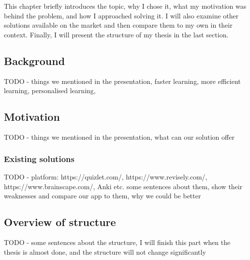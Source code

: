 \chapter{\bevezetes}

This chapter briefly introduces the topic, why I chose it, what my motivation was behind the problem, and how I approached solving it. I will also examine other solutions available on the market and then compare them to my own in their context. Finally, I will present the structure of my thesis in the last section.

\section{Background}
TODO - things we mentioned in the presentation, faster learning, more efficient learning, personalised learning,

\section{Motivation}
TODO - things we mentioned in the presentation, what can our solution offer

\subsection{Existing solutions}
TODO - platform: https://quizlet.com/, https://www.revisely.com/, https://www.brainscape.com/, Anki etc. some sentences about them, show their weaknesses and compare our app to them, why we could be better

\section{Overview of structure}
TODO - some sentences about the structure, I will finish this part when the thesis is almost done, and the structure will not change significantly

